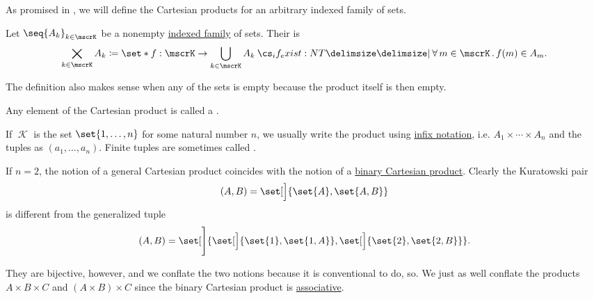 \begin{definition}\label{def:cartesian_product}
  As promised in , we will define the Cartesian products for an arbitrary indexed family of sets.

  Let \( \seq{ A_k }_{k \in \mscrK} \) be a nonempty \hyperref[def:indexed_family]{indexed family} of sets. Their  is
  \begin{equation}\label{eq:def:cartesian_product}
    \bigtimes_{k \in \mscrK} A_k \coloneqq \set*{ f: \mscrK \to \bigcup_{k \in \mscrK} A_k \given* \qforall{m \in \mscrK} f(m) \in A_m }.
  \end{equation}

  The definition also makes sense when any of the sets is empty because the product itself is then empty.

  Any element of the Cartesian product is called a .

  If \( \mscrK \) is the set \( \set{ 1, \ldots, n } \) for some natural number \( n \), we usually write the product using \hyperref[rem:first_order_formula_conventions/infix]{infix notation}, i.e. \( A_1 \times \cdots \times A_n \) and the tuples as \( (a_1, \ldots, a_n) \). Finite tuples are sometimes called .

  If \( n = 2 \), the notion of a general Cartesian product coincides with the notion of a \hyperref[def:binary_cartesian_product]{binary Cartesian product}. Clearly the Kuratowski pair
  \begin{equation*}
    (A, B) = \set[\Big]{ \set{ A }, \set{ A, B } }
  \end{equation*}
  is different from the generalized tuple
  \begin{equation*}
    (A, B) = \set[\Bigg]{ \set[\Big]{ \set{ 1 }, \set{ 1, A } }, \set[\Big]{ \set{ 2 }, \set{ 2, B } } }.
  \end{equation*}

  They are bijective, however, and we conflate the two notions because it is conventional to do, so. We just as well conflate the products \( A \times B \times C \) and \( (A \times B) \times C \) since the binary Cartesian product is \hyperref[def:magma/associative]{associative}.
\end{definition}

